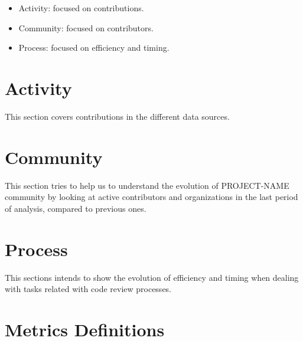\documentclass[a4wide,11pt]{article}
\begin{document}
\begin{itemize}
\item Activity: focused on contributions. 
\item Community: focused on contributors.
\item Process: focused on efficiency and timing.
\end{itemize}

\section{Activity}
This section covers contributions in the different data sources.




\section{Community}
This section tries to help us to understand the evolution of PROJECT-NAME community by looking at active contributors and organizations in the last period of analysis, compared to previous ones.




\section{Process}
This sections intends to show the evolution of efficiency and timing when dealing with tasks related with code review processes.
	


\appendix{}

\section{Metrics Definitions}
\label{chap:metrics_definitions}
\end{document}
